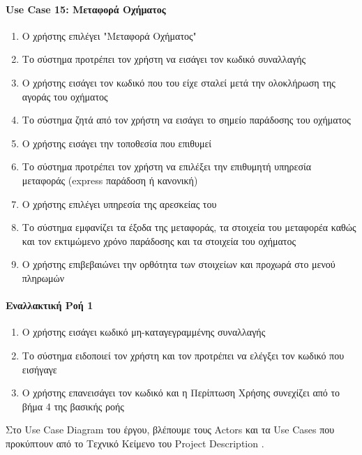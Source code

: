 \documentclass{../ol-softwaremanual}
\begin{document}
	\paragraph{\en Use Case 15: \gr Μεταφορά Οχήματος}  
	\begin{enumerate}
		\item Ο χρήστης επιλέγει \en"\gr Μεταφορά Οχήματος\en"\gr
		\item Το σύστημα προτρέπει τον χρήστη να εισάγει τον κωδικό συναλλαγής
		\item Ο χρήστης εισάγει τον κωδικό που του είχε σταλεί μετά την ολοκλήρωση της αγοράς του οχήματος
		\item Το σύστημα ζητά από τον χρήστη να εισάγει το σημείο παράδοσης του οχήματος
		\item Ο χρήστης εισάγει την τοποθεσία που επιθυμεί
		\item Το σύστημα προτρέπει τον χρήστη να επιλέξει την επιθυμητή υπηρεσία μεταφοράς (\en express \gr παράδοση ή κανονική)
		\item Ο χρήστης επιλέγει υπηρεσία της αρεσκείας του
		\item Το σύστημα εμφανίζει τα έξοδα της μεταφοράς, τα στοιχεία του μεταφορέα καθώς και τον εκτιμώμενο χρόνο παράδοσης και τα στοιχεία του οχήματος
		\item Ο χρήστης επιβεβαιώνει την ορθότητα των στοιχείων και προχωρά στο μενού πληρωμών	
	\end{enumerate}
	
	\paragraph{Εναλλακτική Ροή 1}
	\begin{enumerate}
		\item Ο χρήστης εισάγει κωδικό μη-καταγεγραμμένης συναλλαγής
		\item Το σύστημα ειδοποιεί τον χρήστη και τον προτρέπει να ελέγξει τον κωδικό που εισήγαγε
		\item Ο χρήστης επανεισάγει τον κωδικό και η Περίπτωση Χρήσης συνεχίζει από το βήμα 4 της βασικής ροής
	\end{enumerate}
	
	
	\newpage
	
	
	\vspace{25pt}
	
	\flushleft
	
	Στο \en Use Case Diagram \gr του έργου, βλέπουμε τους \en Actors \gr και τα \en Use Cases \gr που προκύπτουν από το Τεχνικό Κείμενο του \en Project Description \gr.
	
\end{document}
